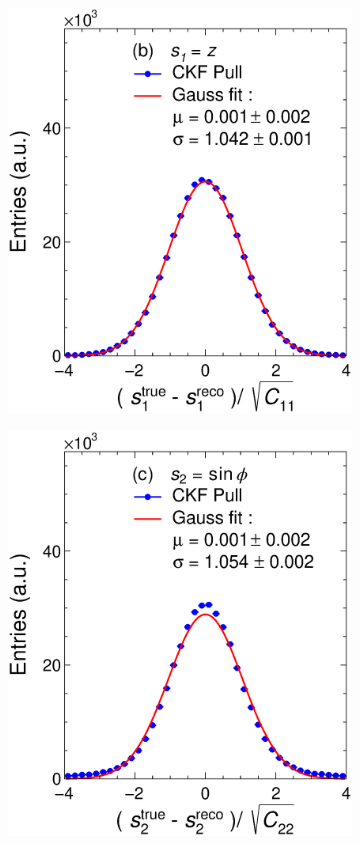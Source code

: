 \begin{figure}[!ht]
\begin{subfigure}{0.32\textwidth}
         \includegraphics[width=\textwidth]{figures/ch5-KF_NDGAr/ToySample/ParScan/UnitK_p1.eps}
         \caption{}
         \label{fig:resp1KFGAr}
     \end{subfigure}
    \begin{subfigure}{0.32\textwidth}
         \centering
         \includegraphics[width=\textwidth]{figures/ch5-KF_NDGAr/ToySample/ParScan/UnitK_p2.eps}

\end{subfigure}
\end{figure}
